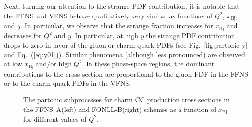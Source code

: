 \documentclass[pdftex,twocolumn,epjc3]{svjour3}          %
\newcommand{\xbj}{\ensuremath{x_{\text{Bj}}}\xspace}
\newcommand{\fonll} {{FONLL-B}\xspace}
\newcommand{\ffns} {{FFNS~A}\xspace}
\begin{document}
%

Next, turning our attention to the strange PDF contribution, it is
notable that the FFNS and VFNS behave qualitatively very similar as
functions of $Q^2$, \xbj, and $y$. In particular, we observe that the
strange fraction increases for \xbj and decreases for $Q^2$ and $y$.
%
In particular, at high $y$ the strange PDF contribution drops to zero
in favor of the gluon or charm quark PDFs (see
Fig.~\ref{fig:partonic-y} and Eq.~(\ref{eq:y01})). Similar phenomena
(although less pronounced) are observed at low \xbj and/or high
$Q^2$. In these phase-space regions, the dominant contributions to the
cross section are proportional to the gluon PDF in the FFNS or to the
charm-quark PDFs in the VFNS.

\begin{figure}
  \centering
  \caption{The partonic subprocesses for charm CC production cross
    sections in the \ffns (left) and \fonll (right) schemes as a
    function of \xbj for different values of $Q^2$.}
  \label{fig:partonic-x}
\end{figure}
\end{document}
